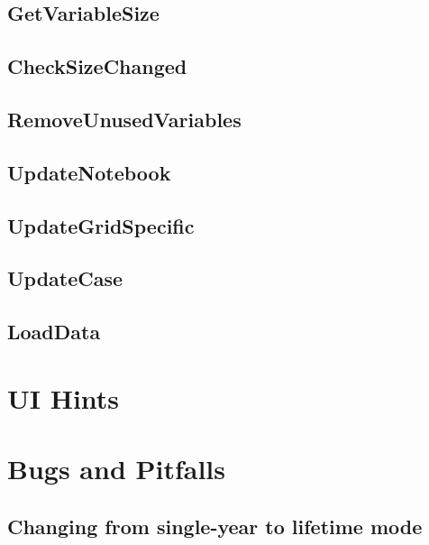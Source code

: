 \documentclass[11pt]{article} %
\begin{document}
\subsection{GetVariableSize}
\subsection{CheckSizeChanged}
\subsection{RemoveUnusedVariables}
\subsection{UpdateNotebook}
\subsection{UpdateGridSpecific}
\subsection{UpdateCase}
\subsection{LoadData}

\section{UI Hints}

\section{Bugs and Pitfalls}
\subsection{Changing from single-year to lifetime mode}
\end{document}
